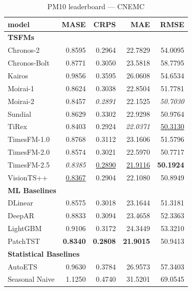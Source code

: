 \begin{table}[H]
\caption{PM10 leaderboard --- CNEMC}
\centering
\begin{small}
\begin{tabular}{lrrrr}
\toprule
model & MASE & CRPS & MAE & RMSE \\
\midrule
\multicolumn{5}{l}{\textbf{TSFMs}} \\
Chronos-2 & 0.8595 & 0.2964 & 22.7829 & 54.0095 \\
Chronos-Bolt & 0.8771 & 0.3050 & 23.5818 & 58.7795 \\
Kairos & 0.9856 & 0.3595 & 26.0608 & 54.6534 \\
Moirai-1 & 0.8624 & 0.3038 & 22.8504 & 51.7781 \\
Moirai-2 & 0.8457 & \textit{0.2891} & 22.1525 & \textit{50.7030} \\
Sundial & 0.8629 & 0.3302 & 22.9298 & 50.9764 \\
TiRex & 0.8403 & 0.2924 & \textit{22.0371} & \underline{50.3130} \\
TimesFM-1.0 & 0.8768 & 0.3112 & 23.1606 & 51.5796 \\
TimesFM-2.0 & 0.8574 & 0.3021 & 22.5970 & 50.7717 \\
TimesFM-2.5 & \textit{0.8385} & \underline{0.2890} & \underline{21.9116} & \textbf{50.1924} \\
VisionTS++ & \underline{0.8367} & 0.2904 & 22.1080 & 50.8949 \\
\midrule
\multicolumn{5}{l}{\textbf{ML Baselines}} \\
DLinear & 0.8575 & 0.3018 & 23.1644 & 51.3181 \\
DeepAR & 0.8833 & 0.3094 & 23.4658 & 52.3363 \\
LightGBM & 0.9106 & 0.3172 & 24.3449 & 53.3210 \\
PatchTST & \textbf{0.8340} & \textbf{0.2808} & \textbf{21.9015} & 50.9413 \\
\midrule
\multicolumn{5}{l}{\textbf{Statistical Baselines}} \\
AutoETS & 0.9630 & 0.3784 & 26.9573 & 57.3403 \\
Seasonal Naive & 1.1250 & 0.4740 & 31.5201 & 69.0545 \\
\bottomrule
\end{tabular}
\end{small}
\end{table}